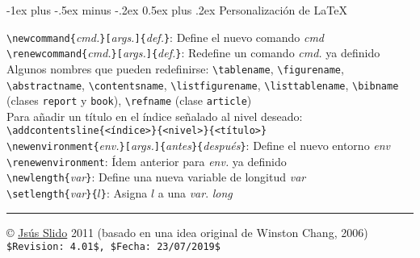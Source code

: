 \documentclass[10pt,landscape,a4paper]{article}
\makeatletter
\renewcommand{\section}{\@startsection{section}{1}{0mm}%
                                {-1ex plus -.5ex minus -.2ex}%
                                {0.5ex plus .2ex}%
                                {\normalfont\large\bfseries}}
\makeatother
\begin{document}
\begin{multicols}{3}
\section{Personalización de \LaTeX}

\verb!\newcommand{!\emph{cmd.}\verb!}[!\emph{args.}\verb!]{!\emph{def.}\verb!}!: Define el nuevo comando \emph{cmd}\\
\verb!\renewcommand{!\emph{cmd.}\verb!}[!\emph{args.}\verb!]{!\emph{def.}\verb!}!: Redefine un comando \emph{cmd.} ya definido\\[0.7mm]

 Algunos nombres que pueden redefinirse: \verb!\tablename!, \verb!\figurename!, \verb!\abstractname!, \verb!\contentsname!, \verb!\listfigurename!, \verb!\listtablename!, \verb!\bibname! (clases \texttt{report} y \texttt{book}), \verb!\refname! (clase \texttt{article})\\
 Para añadir un título en el índice señalado al nivel deseado:\\
\verb|\addcontentsline{<índice>}{<nivel>}{<título>}|\\[0.7mm]
 
\verb!\newenvironment{!\emph{env.}\verb!}[!\emph{args.}\verb!]{!\emph{antes}\verb!}{!\emph{después}\verb!}!: Define el nuevo entorno \emph{env}\\
\verb!\renewenvironment!: Ídem anterior para \emph{env.} ya definido\\
\verb!\newlength{!\emph{var}\verb!}!: Define una nueva variable de longitud \emph{var}\\
\verb!\setlength{!\emph{var}\verb!}{!$l$\verb!}!: Asigna $l$ a una \emph{var}. \emph{long} \\[0.7mm]
 

\rule{0.3\linewidth}{0.25pt}
\scriptsize

\copyright{}  \href{https://www.esi.uclm.es/www/jsalido}{Jsús Slido} 2011 (basado en una idea original de Winston Chang, 2006)\\
\verb!$Revision: 4.01$, $Fecha: 23/07/2019$!

\end{multicols}
\end{document}
